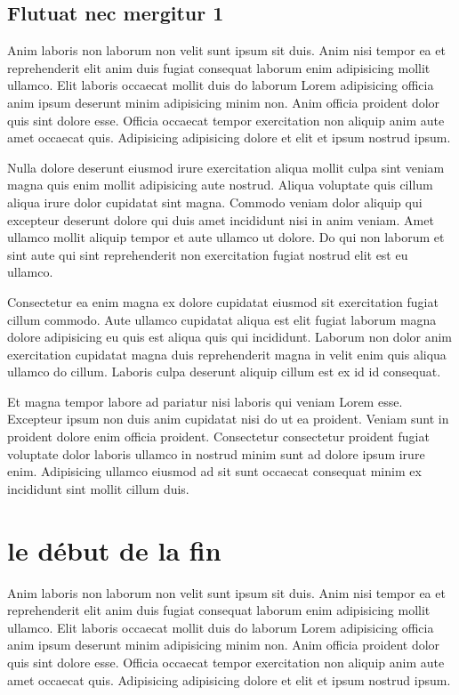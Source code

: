 \documentclass[a4paper,10pt,french]{sphinxmanual}
\begin{document}
\subsection{Flutuat nec mergitur 1}
\label{\detokenize{docs/refs/autocad-refs:flutuat-nec-mergitur-1}}
Anim laboris non laborum non velit sunt ipsum sit duis. Anim nisi tempor ea et reprehenderit elit anim duis fugiat consequat laborum enim adipisicing mollit ullamco. Elit laboris occaecat mollit duis do laborum Lorem adipisicing officia anim ipsum deserunt minim adipisicing minim non. Anim officia proident dolor quis sint dolore esse. Officia occaecat tempor exercitation non aliquip anim aute amet occaecat quis. Adipisicing adipisicing dolore et elit et ipsum nostrud ipsum.

Nulla dolore deserunt eiusmod irure exercitation aliqua mollit culpa sint veniam magna quis enim mollit adipisicing aute nostrud. Aliqua voluptate quis cillum aliqua irure dolor cupidatat sint magna. Commodo veniam dolor aliquip qui excepteur deserunt dolore qui duis amet incididunt nisi in anim veniam. Amet ullamco mollit aliquip tempor et aute ullamco ut dolore. Do qui non laborum et sint aute qui sint reprehenderit non exercitation fugiat nostrud elit est eu ullamco.

Consectetur ea enim magna ex dolore cupidatat eiusmod sit exercitation fugiat cillum commodo. Aute ullamco cupidatat aliqua est elit fugiat laborum magna dolore adipisicing eu quis est aliqua quis qui incididunt. Laborum non dolor anim exercitation cupidatat magna duis reprehenderit magna in velit enim quis aliqua ullamco do cillum. Laboris culpa deserunt aliquip cillum est ex id id consequat.

Et magna tempor labore ad pariatur nisi laboris qui veniam Lorem esse. Excepteur ipsum non duis anim cupidatat nisi do ut ea proident. Veniam sunt in proident dolore enim officia proident. Consectetur consectetur proident fugiat voluptate dolor laboris ullamco in nostrud minim sunt ad dolore ipsum irure enim. Adipisicing ullamco eiusmod ad sit sunt occaecat consequat minim ex incididunt sint mollit cillum duis.


\section{le début de la fin}
\label{\detokenize{docs/refs/autocad-refs:le-debut-de-la-fin}}
Anim laboris non laborum non velit sunt ipsum sit duis. Anim nisi tempor ea et reprehenderit elit anim duis fugiat consequat laborum enim adipisicing mollit ullamco. Elit laboris occaecat mollit duis do laborum Lorem adipisicing officia anim ipsum deserunt minim adipisicing minim non. Anim officia proident dolor quis sint dolore esse. Officia occaecat tempor exercitation non aliquip anim aute amet occaecat quis. Adipisicing adipisicing dolore et elit et ipsum nostrud ipsum.
\end{document}
